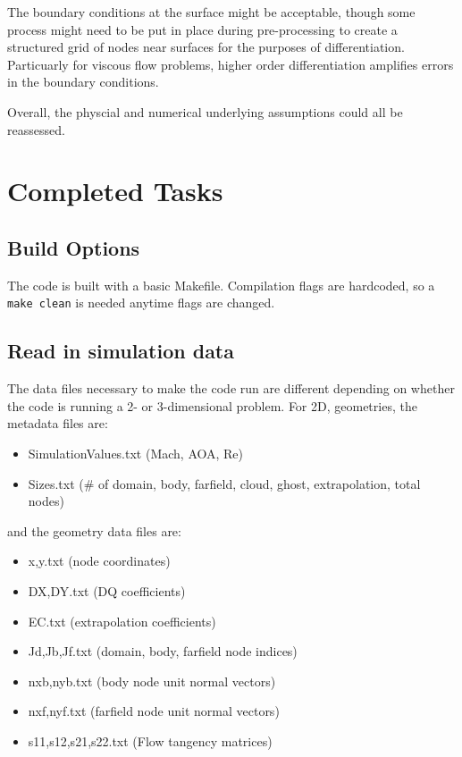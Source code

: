 \documentclass[12pt]{article}
\begin{document}
    The boundary conditions at the surface might be acceptable, though some process might need to be put in place during pre-processing to create a structured grid of nodes near surfaces for the purposes of differentiation. Particuarly for viscous flow problems, higher order differentiation amplifies errors in the boundary conditions.

    Overall, the physcial and numerical underlying assumptions could all be reassessed.
    
    \newpage
    \section{Completed Tasks}

    \subsection{Build Options}
    The code is built with a basic Makefile. Compilation flags are hardcoded, so a \texttt{make clean} is needed anytime flags are changed.

    \subsection{Read in simulation data}
    The data files necessary to make the code run are different depending on whether the code is running a 2- or 3-dimensional problem. For 2D, geometries, the metadata files are:
    \begin{itemize}
        \item SimulationValues.txt (Mach, AOA, Re)
        \item Sizes.txt (\# of domain, body, farfield, cloud, ghost, extrapolation, total nodes)
    \end{itemize}
    and the geometry data files are:
    \begin{itemize}
        \item x,y.txt (node coordinates)
        \item DX,DY.txt (DQ coefficients)
        \item EC.txt (extrapolation coefficients)
        \item Jd,Jb,Jf.txt (domain, body, farfield node indices)
        \item nxb,nyb.txt (body node unit normal vectors)
        \item nxf,nyf.txt (farfield node unit normal vectors)
        \item s11,s12,s21,s22.txt (Flow tangency matrices)
    \end{itemize}
\end{document}

